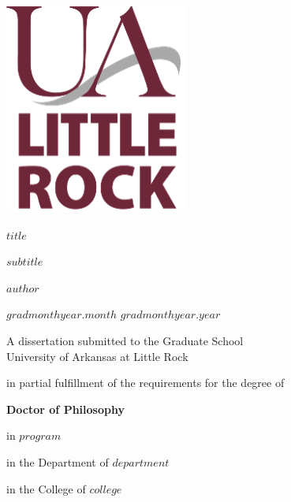 \documentclass[$if(font_size)$$font_size$$else$12pt$endif$]{book}
\newcommand{\thesistitle}{$title$}
\newcommand{\thesistitle}{[Title Placeholder]}
\newcommand{\secondtitle}{$subtitle$}
\newcommand{\secondtitle}{[Subtitle Placeholder]}
\newcommand{\authorname}{$author$}
\newcommand{\authorname}{[Author Placeholder]}
\newcommand{\degree}{Doctor of Philosophy}
\newcommand{\submissiontype}{dissertation}
\newcommand{\degree}{Master of Arts}
\newcommand{\submissiontype}{thesis}
\newcommand{\degree}{Master of Science}
\newcommand{\submissiontype}{thesis}
\newcommand{\degree}{[Degree Placeholder]}
\newcommand{\submissiontype}{[Submission Type Placeholder]}
\newcommand{\program}{$program$}
\newcommand{\program}{[Program Placeholder]}
\newcommand{\department}{$department$}
\newcommand{\department}{[Department Placeholder]}
\newcommand{\college}{$college$}
\newcommand{\college}{[College Placeholder]}
\newcommand{\gradmonth}{$gradmonthyear.month$}
\newcommand{\gradmonth}{[Month]}
\newcommand{\gradyear}{$gradmonthyear.year$}
\newcommand{\gradyear}{[Year]}
\begin{document}
\begin{titlepage}
    \begin{flushleft}
        \includegraphics{img/ua-little-rock.png}
    \end{flushleft}
    \begin{flushleft}
        \vspace{.5cm}
        {\Large\bfseries\sffamily \thesistitle \par}
        {\Large\bfseries\sffamily \secondtitle \par}
        \vspace{1cm}
        {\normalsize\bfseries\sffamily \authorname \par}
        {\normalsize \gradmonth{} \gradyear \par}
        \vspace{1cm}
        {\normalsize A \submissiontype{} submitted to the Graduate School \\ University of Arkansas at Little Rock \par}
        \vspace {1cm}
        {\normalsize in partial fulfillment of the requirements for the degree of \par}
        {\normalsize\bfseries\sffamily \degree \par}
        {\normalsize in \program \par}
        \vspace {1cm}
        {\normalsize in the Department of \department \par}
        {\normalsize in the College of \college \par}
        \hrulefill \\
        \vspace{0.5cm}
        {\normalsize\bfseries{} \par}
        \vspace{0.5cm}

\end{flushleft}
\end{titlepage}
\end{document}
